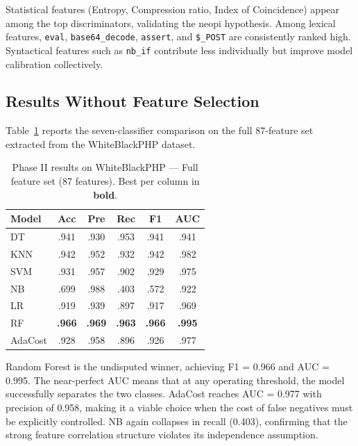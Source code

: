 \documentclass[journal,twocolumn]{IEEEtran}
\begin{document}
Statistical features (Entropy, Compression ratio, Index of Coincidence) appear among the top discriminators, validating the neopi hypothesis. Among lexical features, \texttt{eval}, \texttt{base64\_decode}, \texttt{assert}, and \texttt{\$\_POST} are consistently ranked high. Syntactical features such as \texttt{nb\_if} contribute less individually but improve model calibration collectively.

\subsection{Results Without Feature Selection}

Table~\ref{tab:part2_nofs} reports the seven-classifier comparison on the full 87-feature set extracted from the WhiteBlackPHP dataset.

\begin{table}[H]
\centering
\caption{Phase II results on WhiteBlackPHP --- Full feature set (87 features). Best per column in \textbf{bold}.}
\label{tab:part2_nofs}
\renewcommand{\arraystretch}{1.15}
\begin{tabular}{@{}lccccc@{}}
\toprule
Model & Acc & Pre & Rec & F1 & AUC \\
\midrule
DT              & .941 & .930 & .953 & .941 & .941 \\
KNN             & .942 & .952 & .932 & .942 & .982 \\
SVM             & .931 & .957 & .902 & .929 & .975 \\
NB              & .699 & .988 & .403 & .572 & .922 \\
LR              & .919 & .939 & .897 & .917 & .969 \\
RF              & \textbf{.966} & \textbf{.969} & \textbf{.963} & \textbf{.966} & \textbf{.995} \\
AdaCost         & .928 & .958 & .896 & .926 & .977 \\
\bottomrule
\end{tabular}
\end{table}

Random Forest is the undisputed winner, achieving F1 = 0.966 and AUC = 0.995. The near-perfect AUC means that at any operating threshold, the model successfully separates the two classes. AdaCost reaches AUC = 0.977 with precision of 0.958, making it a viable choice when the cost of false negatives must be explicitly controlled. NB again collapses in recall (0.403), confirming that the strong feature correlation structure violates its independence assumption.
\end{document}
